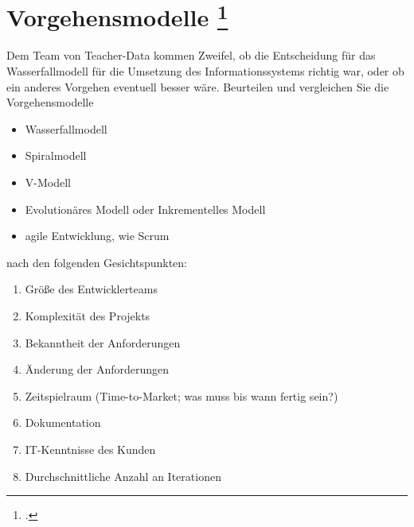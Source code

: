 \documentclass{lehramt-informatik-aufgabe}
\begin{document}
%

\section{Vorgehensmodelle
\footcite[Seite 2]{sosy:ab:1}}

Dem Team von Teacher-Data kommen Zweifel, ob die Entscheidung für das
Wasserfallmodell für die Umsetzung des Informationssystems richtig war,
oder ob ein anderes Vorgehen eventuell besser wäre. Beurteilen und
vergleichen Sie die Vorgehensmodelle

\begin{itemize}
\item Wasserfallmodell
\item Spiralmodell
\item V-Modell
\item Evolutionäres Modell oder
Inkrementelles Modell
\item agile Entwicklung, wie \zB Scrum
\end{itemize}

\noindent
nach den folgenden Gesichtspunkten:

\begin{enumerate}
\item Größe des Entwicklerteams
\item Komplexität des Projekts
\item Bekanntheit der Anforderungen
\item Änderung der Anforderungen
\item Zeitspielraum (Time-to-Market; was muss bis wann fertig sein?)
\item Dokumentation
\item IT-Kenntnisse des Kunden
\item Durchschnittliche Anzahl an Iterationen
\end{enumerate}
\end{document}
